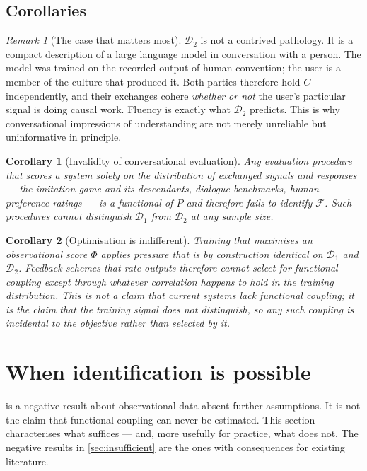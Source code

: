\documentclass[11pt,a4paper]{article}
\theoremstyle{plain}
\newtheorem{corollary}[corollary]{Corollary}
\theoremstyle{definition}
\theoremstyle{remark}
\newtheorem{remark}[remark]{Remark}
\newcommand{\Fc}{\mathcal{F}}
\newcommand{\Dy}{\mathcal{D}}
\begin{document}
\subsection{Corollaries}

\begin{remark}[The case that matters most]\label{rem:d2}
$\Dy_2$ is not a contrived pathology. It is a compact description of a large language model in
conversation with a person. The model was trained on the recorded output of human convention;
the user is a member of the culture that produced it. Both parties therefore hold $C$
independently, and their exchanges cohere \emph{whether or not} the user's particular signal
is doing causal work. Fluency is exactly what $\Dy_2$ predicts. This is why conversational
impressions of understanding are not merely unreliable but uninformative in principle.
\end{remark}

\begin{corollary}[Invalidity of conversational evaluation]\label{cor:turing}
Any evaluation procedure that scores a system solely on the distribution of exchanged signals
and responses --- the imitation game and its descendants, dialogue benchmarks, human
preference ratings --- is a functional of $P$ and therefore fails to identify $\Fc$. Such
procedures cannot distinguish $\Dy_1$ from $\Dy_2$ at any sample size.
\end{corollary}

\begin{corollary}[Optimisation is indifferent]\label{cor:rlhf}
Training that maximises an observational score $\Phi$ applies pressure that is by construction
identical on $\Dy_1$ and $\Dy_2$. Feedback schemes that rate outputs therefore cannot select
for functional coupling except through whatever correlation happens to hold in the training
distribution. This is not a claim that current systems lack functional coupling; it is the
claim that the training signal does not distinguish, so any such coupling is incidental to the
objective rather than selected by it.
\end{corollary}

\section{When identification is possible}\label{sec:identification}

 is a negative result about observational data absent further assumptions. It
is not the claim that functional coupling can never be estimated. This section characterises
what suffices --- and, more usefully for practice, what does not. The negative results in
\cref{sec:insufficient} are the ones with consequences for existing literature.
\end{document}
